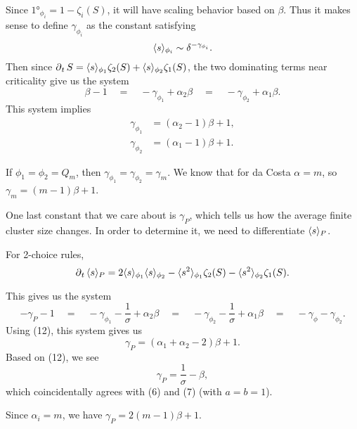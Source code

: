 \documentclass[twoside,10pt]{article}
\begin{document}
Since $\ang{1}_{\phi_i} = 1 - \zeta_i(S)$, it will have scaling behavior based on $\beta$.  Thus it makes sense to define $\gamma_{\phi_i}$ as the constant satisfying
\[
\langle s \rangle_{\phi_i} \sim \delta^{-\gamma_{\phi_i}}.
\] 
Then since $\operatorname{\partial}_{t}{S} = \langle s \rangle_{\phi_1}\zeta_2(S) + \langle s \rangle_{\phi_2}\zeta_1(S)$, the two dominating terms near criticality give us the system
\[
\beta - 1 \quad=\quad -\gamma_{\phi_1} + \alpha_2 \beta \quad=\quad -\gamma_{\phi_2}+\alpha_1 \beta.
\] 
This system implies
\begin{align}
	\gamma_{\phi_1} &= (\alpha_2-1)\beta + 1,\\
	\gamma_{\phi_2} &= (\alpha_1-1)\beta + 1.
\end{align}
\begin{ex}[da Costa]
	If $\phi_1=\phi_2=Q_m$, then $\gamma_{\phi_1}=\gamma_{\phi_2}=\gamma_{m}$. We know that for da Costa $\alpha=m$, so $\gamma_{m} = (m-1)\beta+1$.
\end{ex}

One last constant that we care about is $\gamma_{P}$, which tells us how the average finite cluster size changes. In order to determine it, we need to differentiate $\langle s \rangle_{P}$.

\begin{prop}
For 2-choice rules,
\[
	\operatorname{\partial}_{t}{\langle s \rangle_{P}} = 2\langle s \rangle_{\phi_1}\langle s \rangle_{\phi_2} - \langle s^2 \rangle_{\phi_1}\zeta_2(S) - \langle s^2 \rangle_{\phi_2}\zeta_1(S).
\] 
\end{prop}


This gives us the system
\[
-\gamma_{P}-1 \quad=\quad -\gamma_{\phi_1}-\frac{1}{\sigma} +\alpha_2\beta \quad=\quad -\gamma_{\phi_2}-\frac{1}{\sigma} +\alpha_1\beta \quad=\quad -\gamma_{\phi}-\gamma_{\phi_2}.
\] 
Using (12), this system gives us
\begin{equation}
	\gamma_{P} = (\alpha_1+\alpha_2-2)\beta+1.
\end{equation}
Based on (12), we see
\[
\gamma_{P} = \frac{1}{\sigma} -\beta,
\] which coincidentally agrees with (6) and (7) (with $a=b=1$).


\begin{ex}[da Costa]
	Since $\alpha_i=m$, we have $\gamma_{P}=2(m-1)\beta+1$.
\end{ex}
\end{document}
